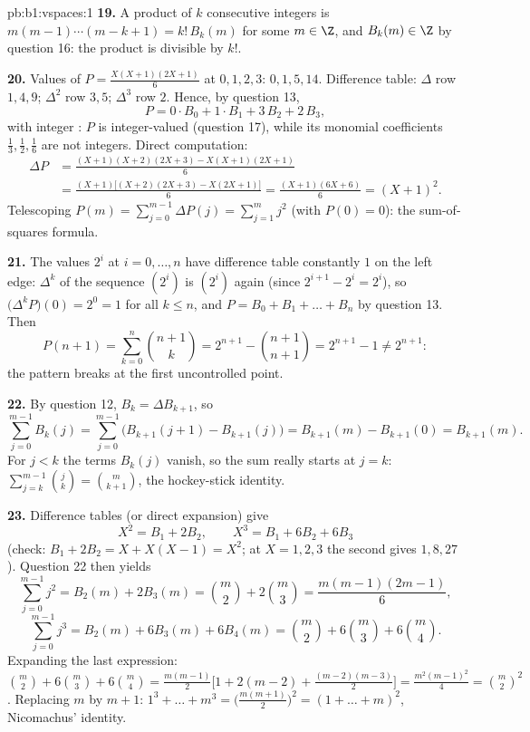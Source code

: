 \begin{solution}{pb:b1:vspaces:1}
\textbf{19.} A product of $k$ consecutive integers is $m(m-1)
\cdots(m-k+1) = k!\,B_k(m)$ for some $m \in \Z$, and $B_k(m) \in
\Z$ by question 16: the product is divisible by $k!$.

\textbf{20.} Values of $P = \frac{X(X+1)(2X+1)}{6}$ at $0,1,2,3$:
$0, 1, 5, 14$. Difference table: $\Delta$ row $1, 4, 9$;
$\Delta^2$ row $3, 5$; $\Delta^3$ row $2$. Hence, by question 13,
\[
P = 0\cdot B_0 + 1\cdot B_1 + 3\,B_2 + 2\,B_3 ,
\]
with integer : $P$ is integer-valued (question 17),
while its monomial coefficients $\frac13, \frac12, \frac16$ are
not integers. Direct computation:
\begin{align*}
\Delta P &= \frac{(X+1)(X+2)(2X+3) - X(X+1)(2X+1)}{6} \\
&= \frac{(X+1)\bigl[(X+2)(2X+3) - X(2X+1)\bigr]}{6}
= \frac{(X+1)(6X+6)}{6} = (X+1)^2 .
\end{align*}
Telescoping $P(m) = \sum_{j=0}^{m-1}\Delta P(j) = \sum_{j=1}^{m}
j^2$ (with $P(0) = 0$): the sum-of-squares formula.

\textbf{21.} The values $2^i$ at $i = 0, \dots, n$ have difference
table constantly $1$ on the left edge: $\Delta^k$ of the sequence
$(2^i)$ is $(2^i)$ again (since $2^{i+1} - 2^i = 2^i$), so
$\bigl(\Delta^k P\bigr)(0) = 2^0 = 1$ for all $k \leq n$, and $P =
B_0 + B_1 + \dots + B_n$ by question 13. Then
\[
P(n+1) = \sum_{k=0}^{n}\binom{n+1}{k}
= 2^{n+1} - \binom{n+1}{n+1} = 2^{n+1} - 1 \neq 2^{n+1}:
\]
the pattern breaks at the first uncontrolled point.

\textbf{22.} By question 12, $B_k = \Delta B_{k+1}$, so
\[
\sum_{j=0}^{m-1} B_k(j)
= \sum_{j=0}^{m-1}\bigl(B_{k+1}(j+1) - B_{k+1}(j)\bigr)
= B_{k+1}(m) - B_{k+1}(0) = B_{k+1}(m).
\]
For $j < k$ the terms $B_k(j)$ vanish, so the sum really starts at
$j = k$: $\sum_{j=k}^{m-1}\binom jk = \binom m{k+1}$, the
hockey-stick identity.

\textbf{23.} Difference tables (or direct expansion) give
\[
X^2 = B_1 + 2 B_2, \qquad X^3 = B_1 + 6 B_2 + 6 B_3
\]
(check: $B_1 + 2B_2 = X + X(X-1) = X^2$; at $X = 1, 2, 3$ the
second gives $1, 8, 27$). Question 22 then yields
\[
\sum_{j=0}^{m-1} j^2 = B_2(m) + 2B_3(m)
= \binom m2 + 2\binom m3 = \frac{m(m-1)(2m-1)}{6},
\]
\[
\sum_{j=0}^{m-1} j^3 = B_2(m) + 6B_3(m) + 6B_4(m)
= \binom m2 + 6\binom m3 + 6\binom m4 .
\]
Expanding the last expression: $\binom m2 + 6\binom m3 + 6\binom
m4 = \frac{m(m-1)}{2}\bigl[1 + 2(m-2) +
\frac{(m-2)(m-3)}{2}\bigr] = \frac{m^2(m-1)^2}{4} = \binom m2^2$.
Replacing $m$ by $m + 1$: $1^3 + \dots + m^3 =
\bigl(\frac{m(m+1)}2\bigr)^2 = (1 + \dots + m)^2$, Nicomachus'
identity.


\end{solution}
